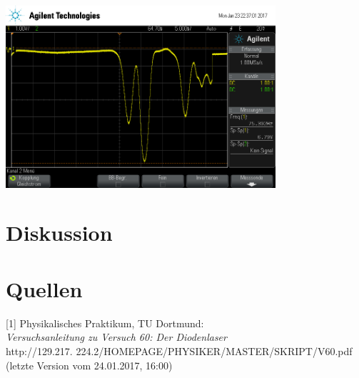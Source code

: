 \documentclass[captions=tableheading]{scrartcl}
\begin{document}
\begin{center}
	\includegraphics[width=10cm]{images/resonanz_bereinigt.png}
	\label{fig:resonanzlinien_mh}
	\end{center}

\section{Diskussion}

\section{Quellen}
{[1]} Physikalisches Praktikum, TU Dortmund: \\
\textit{Versuchsanleitung zu Versuch 60: Der Diodenlaser} \\
http://129.217.
224.2/HOMEPAGE/PHYSIKER/MASTER/SKRIPT/V60.pdf (letzte Version vom 24.01.2017, 16:00)\\
\end{document}

